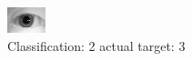 \begin{figure}[h!]
\begin{center}
\includegraphics[width=0.60\columnwidth]{figures/ID1046_class_2_target_3.png}
\end{center}
\caption{ Classification: 2 actual target: 3}
\label{fig:ID1046_class_2_target_3}
\end{figure}
